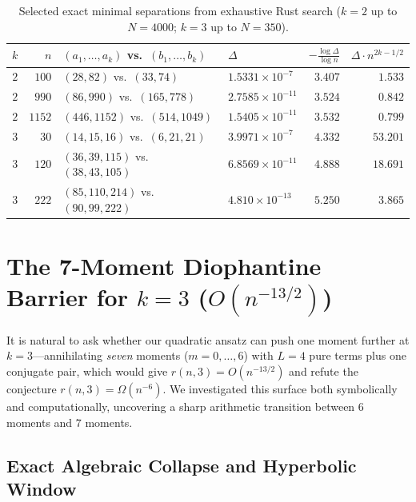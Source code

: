 \documentclass[11pt,a4paper]{article}
\theoremstyle{definition}
\theoremstyle{remark}
\begin{document}
\begin{table}[ht]
\centering
\footnotesize
\caption{Selected exact minimal separations from exhaustive Rust search ($k = 2$ up to $N = 4000$; $k = 3$ up to $N = 350$).}
\label{tab:records}
\begin{tabular}{@{}crllrr@{}}
\toprule
$k$ & $n$ & $(a_1, \dots, a_k)$ vs.\ $(b_1, \dots, b_k)$ & $\Delta$ & $-\frac{\log \Delta}{\log n}$ & $\Delta \cdot n^{2k - 1/2}$ \\
\midrule
$2$ & $100$ & $(28, 82)$ vs.\ $(33, 74)$ & $1.5331 \times 10^{-7}$ & $3.407$ & $1.533$ \\
$2$ & $990$ & $(86, 990)$ vs.\ $(165, 778)$ & $2.7585 \times 10^{-11}$ & $3.524$ & $0.842$ \\
$2$ & $1152$ & $(446, 1152)$ vs.\ $(514, 1049)$ & $1.5405 \times 10^{-11}$ & $3.532$ & $0.799$ \\
\midrule
$3$ & $30$ & $(14, 15, 16)$ vs.\ $(6, 21, 21)$ & $3.9971 \times 10^{-7}$ & $4.332$ & $53.201$ \\
$3$ & $120$ & $(36, 39, 115)$ vs.\ $(38, 43, 105)$ & $6.8569 \times 10^{-11}$ & $4.888$ & $18.691$ \\
$3$ & $222$ & $(85, 110, 214)$ vs.\ $(90, 99, 222)$ & $4.810 \times 10^{-13}$ & $5.250$ & $3.865$ \\
\bottomrule
\end{tabular}
\end{table}

\section{The 7-Moment Diophantine Barrier for $k = 3$ ($O(n^{-13/2})$)}
\label{sec:seven-moment}

It is natural to ask whether our quadratic ansatz can push one moment further at $k = 3$---annihilating \emph{seven} moments ($m = 0, \dots, 6$) with $L = 4$ pure terms plus one conjugate pair, which would give $r(n, 3) = O(n^{-13/2})$ and refute the conjecture $r(n, 3) = \Omega(n^{-6})$. We investigated this surface both symbolically and computationally, uncovering a sharp arithmetic transition between $6$ moments and $7$ moments.

\subsection{Exact Algebraic Collapse and Hyperbolic Window}
\end{document}
